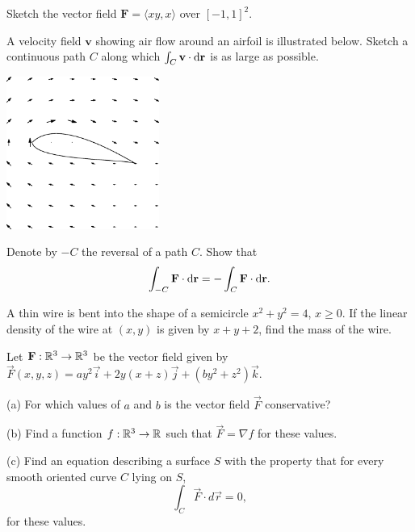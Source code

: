 \documentclass[prettycode,shellescape]{watsonbook}
\begin{document}

\begin{aexercise}
  Sketch the vector field $\mathbf{F} =\langle xy, x\rangle$ over
  $[-1,1]^2$. 
\end{aexercise}

\begin{aexercise}
  A velocity field $\mathbf{v}$ showing air flow around an airfoil is
  illustrated below. Sketch a continuous path $C$ along which
  $\int_C \mathbf{v} \cdot \mathrm{d}\mathbf{r}$ is as large as possible. 
  \begin{center}
    \includegraphics[width=5cm]{exercisefigures/airfoil.pdf}
  \end{center}
\end{aexercise}

\begin{aexercise}
  Denote by $-C$ the reversal of a path $C$. Show that 
  \[
    \int_{-C} \mathbf{F} \cdot \mathrm{d}\mathbf{r} = -\int_{C}\mathbf{F}
    \cdot \mathrm{d}\mathbf{r}. 
  \]
\end{aexercise}


\begin{aexercise}
  A thin wire is bent into the shape of a semicircle $x^2 + y^2 = 4$,
  $x \geq 0$. If the linear density of the wire at $(x,y)$ is given by
  $x+y+2$, find the mass of the wire. 
\end{aexercise}

\begin{aexercise}
  Let $\mathbf{F}:\mathbb{R}^3 \to \mathbb{R}^3$ be the vector field given by
  $\vec{F}(x,y,z)=ay^2\vec{i}+2y(x+z)\vec{j}+(by^2 +z^2)\vec{k}$.

  (a) For which values of $a$ and $b$ is the vector field $\vec{F}$
  conservative?

  (b) Find a function $f:\mathbb{R}^3 \to \mathbb{R}$ such that $\vec{F} = \nabla f$
  for these values.

  (c) Find an equation describing a surface $S$ with the property that
  for every smooth oriented curve $C$ lying on $S$,
  \[
    \int_C \vec{F}\cdot d\vec{r} = 0,
  \]
  for these values.
\end{aexercise}
\end{document}
